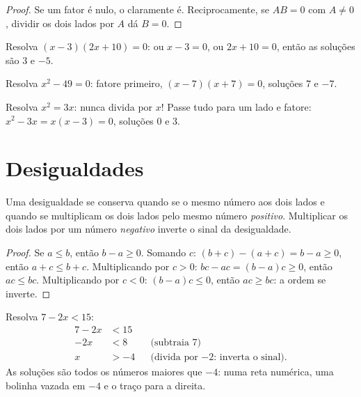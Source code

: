 \begin{proof}
Se um fator é nulo, o  claramente é. Reciprocamente, se
$A B = 0$ com $A \neq 0$, dividir os dois lados por $A$ dá $B = 0$.
\end{proof}

\begin{example}\label{ex:g9:algebra:zeroproduct}
Resolva $(x - 3)(2x + 10) = 0$: ou $x - 3 = 0$, ou $2x + 10 = 0$, então
as soluções são $3$ e $-5$.

Resolva $x^2 - 49 = 0$: fatore primeiro, $(x-7)(x+7) = 0$, soluções $7$
e $-7$.

Resolva $x^2 = 3x$: nunca divida por $x$! Passe tudo para um lado e
fatore: $x^2 - 3x = x(x - 3) = 0$, soluções $0$ e $3$.
\end{example}

\section{Desigualdades}

\begin{proposition}\label{prop:g9:algebra:ineq}
Uma desigualdade se conserva quando se  o mesmo número aos dois
lados e quando se multiplicam os dois lados pelo mesmo número
\emph{positivo}. Multiplicar os dois lados por um número
\emph{negativo} inverte o sinal da desigualdade.
\end{proposition}

\begin{proof}
Se $a \leq b$, então $b - a \geq 0$. Somando $c$:
$(b+c) - (a+c) = b - a \geq 0$, então $a + c \leq b + c$. Multiplicando
por $c > 0$: $bc - ac = (b-a)c \geq 0$, então $ac \leq bc$.
Multiplicando por $c < 0$: $(b-a)c \leq 0$, então $ac \geq bc$: a ordem
se inverte.
\end{proof}

\begin{example}\label{ex:g9:algebra:ineq}
Resolva $7 - 2x < 15$:
\begin{align*}
7 - 2x &< 15 \\
-2x &< 8 && \text{(subtraia 7)} \\
x &> -4 && \text{(divida por $-2$: inverta o sinal).}
\end{align*}
As soluções são todos os números maiores que $-4$: numa reta numérica,
uma bolinha vazada em $-4$ e o traço para a direita.
\end{example}

